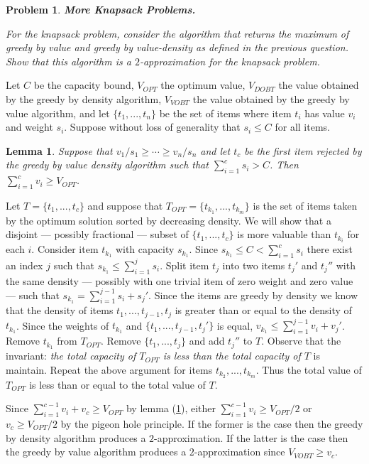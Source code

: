 \documentclass[11pt]{article}
\newtheorem{lemma}[theorem]{Lemma}
\newtheorem{problem}{Problem}
\begin{document}
\begin{problem}
\textbf{More Knapsack Problems.} 

For the knapsack problem, consider the algorithm that returns the maximum of \emph{greedy by value} and \emph{greedy by value-density} as defined in the previous question. Show that this algorithm is a $2$-approximation for the knapsack problem. 
\end{problem}
\begin{prf}

Let $C$ be the capacity bound, $V_{OPT}$ the optimum value, $V_{DOBT}$ the value obtained by the greedy by density algorithm, $V_{VOBT}$ the value obtained by the greedy by value algorithm, and let $\{t_1, ..., t_n\}$ be the set of items where item $t_i$ has value $v_i$ and weight $s_i$. Suppose without loss of generality that $s_i \leq C$ for all items.

\begin{lemma}
\label{lem:Q3greedybydensityisgood}
Suppose that $v_1/s_1 \geq \cdots \geq v_n/s_n$ and let $t_c$ be the first item rejected by the greedy by value density algorithm such that $\sum_{i=1}^{c}s_i > C$. Then $\sum_{i=1}^{c} v_i \geq V_{OPT}$. 
\end{lemma}
\begin{prf}
Let $T = \{t_1, ..., t_c\}$ and suppose that $T_{OPT} = \{t_{k_1}, ..., t_{k_m}\}$ is the set of items taken by the optimum solution sorted by decreasing density. We will show that a disjoint --- possibly fractional --- subset of $\{t_1, ..., t_c\}$ is more valuable than $t_{k_i}$ for each $i$. Consider item $t_{k_1}$ with capacity $s_{k_1}$. Since $s_{k_1} \leq C < \sum_{i=1}^{c}s_i$ there exist an index $j$ such that $s_{k_1} \leq \sum_{i=1}^{j}s_i$. Split item $t_j$ into two items $t_j'$ and $t_j''$ with the same density --- possibly with one trivial item of zero weight and zero value --- such that $ s_{k_1} = \sum_{i=1}^{j-1}s_i + s_{j}'$. Since the items are greedy by density we know that the density of items $t_1, ..., t_{j-1}, t_j$ is greater than or equal to the density of $t_{k_1}$. Since the weights of $t_{k_1}$ and $\{t_1, ..., t_{j-1}, t_j'\}$ is equal, $v_{k_1} \leq \sum_{i=1}^{j-1} v_{i} + v_{j}'$. Remove $t_{k_1}$ from $T_{OPT}$. Remove $\{t_1, ..., t_j\}$ and add $t_{j}''$ to $T$. Observe that the invariant: \emph{the total capacity of $T_{OPT}$ is less than the total capacity of $T$} is maintain. Repeat the above argument for items $t_{k_2}, ..., t_{k_m}$. Thus the total value of $T_{OPT}$ is less than or equal to the total value of $T$. 
\end{prf}

Since $\sum_{i=1}^{c-1} v_i + v_c \geq V_{OPT}$ by lemma (\ref{lem:Q3greedybydensityisgood}),  either $\sum_{i=1}^{c-1} v_i \geq V_{OPT}/2$ or $v_c \geq V_{OPT}/2$ by the pigeon hole principle. If the former is the case then the greedy by density algorithm produces a $2$-approximation. If the latter is the case then the greedy by value algorithm produces a $2$-approximation since $V_{VOBT} \geq v_c$.   
\end{prf}
\end{document}
